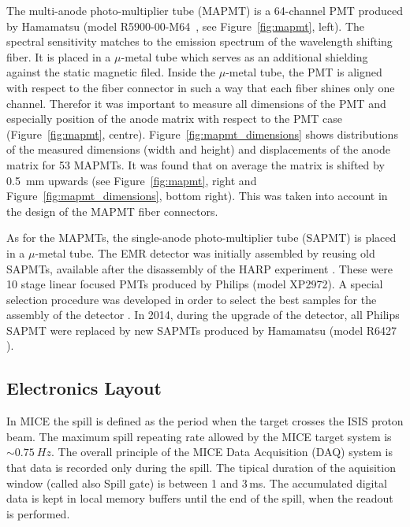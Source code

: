 \documentclass[a4paper,11pt]{article}
\begin{document}
The multi-anode photo-multiplier tube (MAPMT) is a 64-channel PMT produced by Hamamatsu (model R5900-00-M64~\cite{hamamatsu_mapmt}, see
Figure~\ref{fig:mapmt}, left). The spectral sensitivity matches to the emission spectrum of the wavelength shifting fiber. It is 
placed in a $\mu$-metal tube  which serves as an additional shielding against the static magnetic filed. Inside the $\mu$-metal tube,
the PMT is aligned with respect to the fiber connector in such a way that each fiber shines only one
channel. Therefor it was important to measure all dimensions of the PMT and especially position of the anode matrix with respect to the
PMT case (Figure~\ref{fig:mapmt}, centre). Figure~\ref{fig:mapmt_dimensions} shows distributions of the measured dimensions (width and
height) and displacements of the anode matrix for 53 MAPMTs. It was found that on average the matrix is shifted by 0.5~mm upwards (see
Figure~\ref{fig:mapmt}, right and Figure~\ref{fig:mapmt_dimensions}, bottom right). This was taken into account in the design of the
MAPMT fiber connectors.

As for the MAPMTs, the single-anode photo-multiplier tube (SAPMT) is placed in a $\mu$-metal tube. The EMR detector was initially assembled
by reusing old SAPMTs, available after the disassembly of the HARP experiment \cite{harp}. These were 10 stage linear focused PMTs produced
by Philips (model XP2972). A special selection procedure was developed in order to select the best samples for the assembly of the detector
\cite{philips}. In 2014, during the upgrade of the detector, all Philips SAPMT were replaced by new SAPMTs produced by Hamamatsu (model R6427
\cite{hamamatsu_mapmt}).

\subsection{Electronics Layout}
In MICE the spill is defined as the period when the target crosses the ISIS proton beam. The maximum spill repeating rate allowed by the
MICE target system is $\sim 0.75 \ Hz$. The overall principle of the MICE Data Acquisition (DAQ) system is that data is recorded only during
the spill. The tipical duration of the aquisition window (called also Spill gate) is between 1 and 3\,ms. The accumulated digital data is
kept in local memory buffers until the end of the spill, when the readout is performed.
\end{document}

